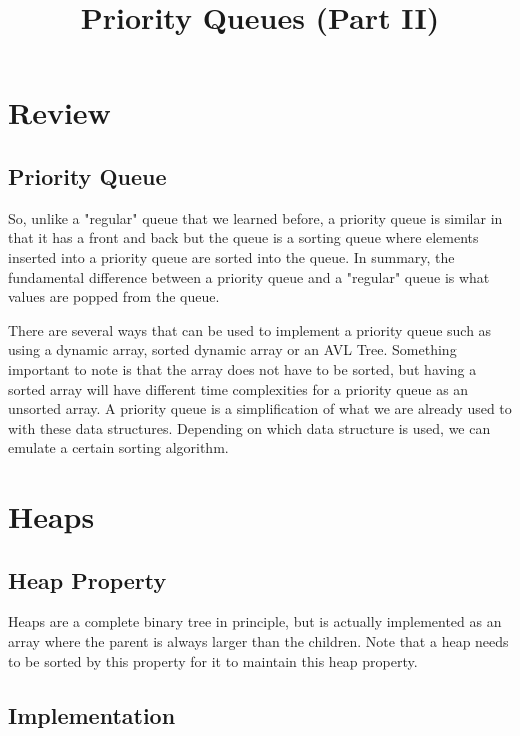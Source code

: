 \documentclass[11pt,a4paper,english]{article}
\begin{document}
\title{Priority Queues (Part II)}

\maketitle

\tableofcontents

\section{Review}

\subsection{Priority Queue}

So, unlike a "regular" queue that we learned before, a priority queue is similar in that it has a front and back but the queue is a sorting queue where elements inserted into a priority queue are sorted into the queue. In summary, the fundamental difference between a priority queue and a "regular" queue is what values are popped from the queue. 

\bigskip \noindent
There are several ways that can be used to implement a priority queue such as using a dynamic array, sorted dynamic array or an AVL Tree. Something important to note is that the array does not have to be sorted, but having a sorted array will have different time complexities for a priority queue as an unsorted array. A priority queue is a simplification of what we are already used to with these data structures. Depending on which data structure is used, we can emulate a certain sorting algorithm.

\pagebreak

\section{Heaps}

\subsection{Heap Property}

Heaps are a complete binary tree in principle, but is actually implemented as an array where the parent is always larger than the children. Note that a heap needs to be sorted by this property for it to maintain this heap property.

\subsection{Implementation}
\end{document}
